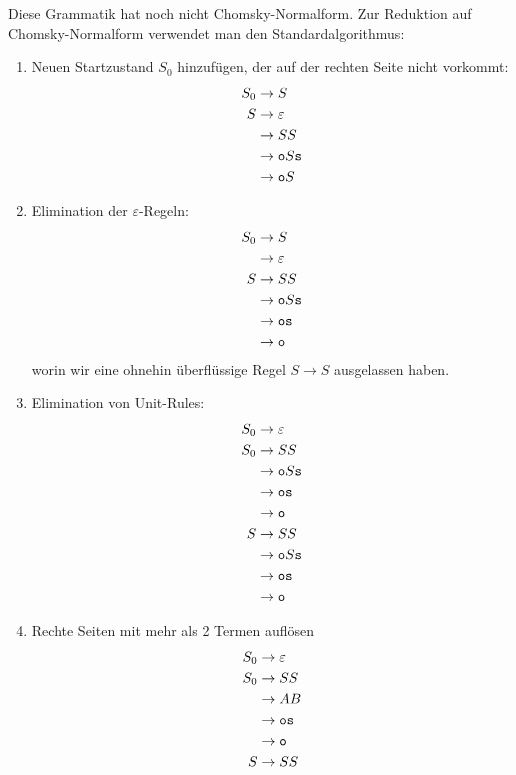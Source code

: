\begin{loesung}
Diese Grammatik hat noch nicht Chomsky-Normalform. Zur Reduktion auf
Chomsky-Normalform verwendet man den Standardalgorithmus:
\begin{enumerate}
\item Neuen Startzustand $S_0$ hinzufügen, der auf der rechten Seite
nicht vorkommt:
\begin{align*}
S_0&\rightarrow S\\
S&\rightarrow \varepsilon\\
 &\rightarrow SS\\
 &\rightarrow {\tt o}S{\tt s}\\
 &\rightarrow {\tt o}S
\end{align*}
\item Elimination der $\varepsilon$-Regeln:
\begin{align*}
S_0&\rightarrow S\\
   &\rightarrow \varepsilon\\
S&\rightarrow SS\\
 &\rightarrow {\tt o}S{\tt s}\\
 &\rightarrow {\tt o}{\tt s}\\
 &\rightarrow {\tt o}
\end{align*}
worin wir eine ohnehin überflüssige Regel $S\rightarrow S$
ausgelassen haben.
\item Elimination von Unit-Rules:
\begin{align*}
S_0&\rightarrow \varepsilon\\
S_0&\rightarrow SS\\
   &\rightarrow {\tt o}S{\tt s}\\
   &\rightarrow {\tt o}{\tt s}\\
   &\rightarrow {\tt o}\\
S&\rightarrow SS\\
 &\rightarrow {\tt o}S{\tt s}\\
 &\rightarrow {\tt o}{\tt s}\\
 &\rightarrow {\tt o}
\end{align*}
\item Rechte Seiten mit mehr als 2 Termen auflösen
\begin{align*}
S_0&\rightarrow \varepsilon\\
S_0&\rightarrow SS\\
   &\rightarrow AB\\
   &\rightarrow {\tt o}{\tt s}\\
   &\rightarrow {\tt o}\\
S&\rightarrow SS\\

\end{align*}
\end{enumerate}
\end{loesung}
